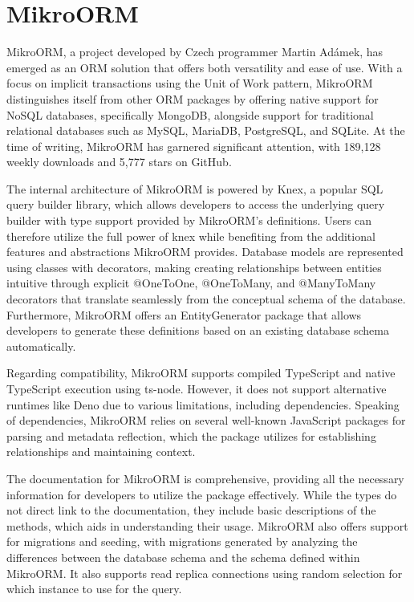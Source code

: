 \section{MikroORM}

MikroORM, a project developed by Czech programmer Martin Adámek, has emerged as
an ORM solution that offers both versatility and ease of use. With a focus on
implicit transactions using the Unit of Work pattern, MikroORM distinguishes
itself from other ORM packages by offering native support for NoSQL databases,
specifically MongoDB, alongside support for traditional relational databases
such as MySQL, MariaDB, PostgreSQL, and SQLite. At the time of writing,
MikroORM has garnered significant attention, with 189,128 weekly downloads and
5,777 stars on GitHub.

The internal architecture of MikroORM is powered by Knex, a popular SQL query
builder library, which allows developers to access the underlying query builder
with type support provided by MikroORM's definitions. Users can therefore
utilize the full power of knex while benefiting from the additional features and
abstractions MikroORM provides. Database models are represented using classes
with decorators, making creating relationships between entities intuitive
through explicit @OneToOne, @OneToMany, and @ManyToMany decorators that
translate seamlessly from the conceptual schema of the database. Furthermore,
MikroORM offers an EntityGenerator package that allows developers to generate
these definitions based on an existing database schema automatically.

Regarding compatibility, MikroORM supports compiled TypeScript and native
TypeScript execution using ts-node. However, it does not support alternative
runtimes like Deno due to various limitations, including dependencies. Speaking
of dependencies, MikroORM relies on several well-known JavaScript packages for
parsing and metadata reflection, which the package utilizes for establishing
relationships and maintaining context.

The documentation for MikroORM is comprehensive, providing all the necessary
information for developers to utilize the package effectively. While the types
do not direct link to the documentation, they include basic descriptions of the
methods, which aids in understanding their usage. MikroORM also offers support
for migrations and seeding, with migrations generated by analyzing the
differences between the database schema and the schema defined within MikroORM.
It also supports read replica connections using random selection for which
instance to use for the query.

